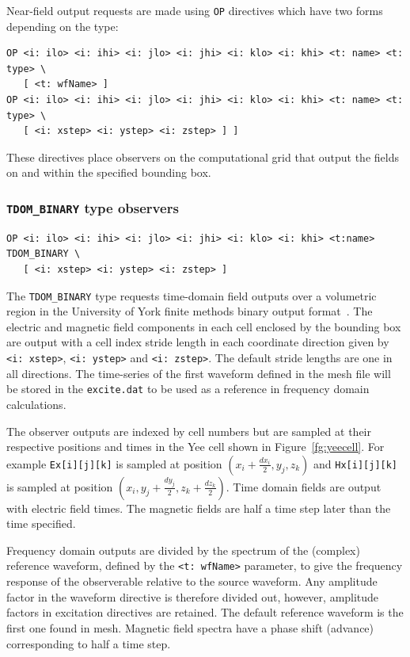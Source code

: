 \documentclass[onecolumn,a4paper]{article}
\numberwithin{equation}{section}
\begin{document}
Near-field output requests are made using \texttt{OP} directives which have two forms depending on the type:
\begin{verbatim}
OP <i: ilo> <i: ihi> <i: jlo> <i: jhi> <i: klo> <i: khi> <t: name> <t: type> \
   [ <t: wfName> ]
OP <i: ilo> <i: ihi> <i: jlo> <i: jhi> <i: klo> <i: khi> <t: name> <t: type> \
   [ <i: xstep> <i: ystep> <i: zstep> ] ]
\end{verbatim}
These directives place observers on the computational grid that output the fields on and within 
the specified bounding box. 

\subsubsection{\texttt{TDOM\_BINARY} type observers}

\begin{verbatim}
OP <i: ilo> <i: ihi> <i: jlo> <i: jhi> <i: klo> <i: khi> <t:name> TDOM_BINARY \
   [ <i: xstep> <i: ystep> <i: zstep> ]
\end{verbatim}

The \texttt{TDOM\_BINARY} type requests time-domain field outputs over a volumetric region in the 
University of York finite methods binary output format~\cite{procman}. The electric and
magnetic field components in each cell enclosed by the bounding box are output with a cell index stride 
length in each coordinate direction given by \texttt{<i:~xstep>}, \texttt{<i:~ystep>} and \texttt{<i:~zstep>}.
The default stride lengths are one in all directions. The time-series of the first waveform defined in the
mesh file will be stored in the \texttt{excite.dat} to be used as a reference in frequency domain calculations.

The observer outputs are indexed by cell numbers but are sampled at their respective positions and times in 
the Yee cell shown in Figure~\ref{fg:yeecell}. For example \texttt{Ex[i][j][k]} is sampled at position 
$(x_i + \frac{dx_i}{2} , y_j , z_k )$ and \texttt{Hx[i][j][k]} is sampled at position 
$(x_i , y_j + \frac{dy_j}{2}, z_k + \frac{dz_k}{2} )$. Time domain fields are output with electric field times. 
The magnetic fields are half a time step later than the time specified. 

Frequency domain outputs are divided by the spectrum of the (complex) reference waveform, defined by 
the \texttt{<t:~wfName>} parameter, to give the frequency response of the observerable
relative to the source waveform. Any amplitude factor in the waveform directive is therefore divided out, however,
amplitude factors in excitation directives are retained. The default reference waveform is the first one found in mesh. 
Magnetic field spectra have a phase shift (advance) corresponding to half a time step.
\end{document}
